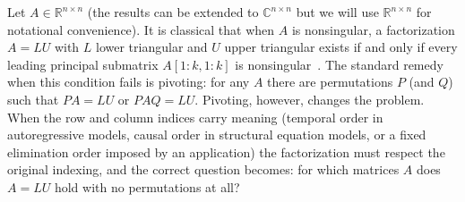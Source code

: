\documentclass[preprint,12pt]{elsarticle}
\theoremstyle{plain}
\theoremstyle{nonumberplain}
\numberwithin{equation}{section}
\newcommand{\by}{\times}
\numberwithin{theorem}{section}
\begin{document}
Let $A \in \mathbb{R}^{n \by n}$ (the results can be extended to $\mathbb{C}^{n \by n}$ but we will use $\mathbb{R}^{n \by n}$ for notational convenience).  It is classical that when $A$ is nonsingular, a factorization $A = LU$ with $L$ lower triangular and $U$ upper triangular exists if and only if every leading principal submatrix $A[1:k,1:k]$ is nonsingular~\cite{higham_gaussian_2011,golub_matrix_2013}. The standard remedy when this condition fails is pivoting: for any $A$ there are permutations $P$ (and $Q$) such that $PA = LU$ or $PAQ = LU$.  Pivoting, however, changes the problem.  When the row and column indices carry meaning (temporal order in autoregressive models, causal order in structural equation models, or a fixed elimination order imposed by an application) the factorization must respect the original indexing, and the correct question becomes: for which matrices $A$ does $A = LU$ hold with no permutations at all?
\end{document}

